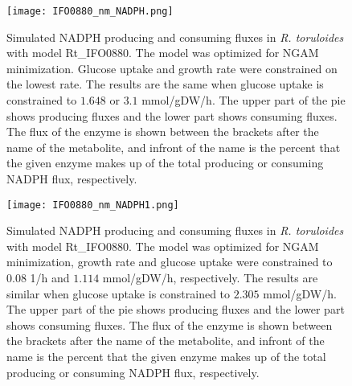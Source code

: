 \begin{figure}[H]
    \centering
    \texttt{[image: IFO0880\_nm\_NADPH.png]}
    \caption{Simulated NADPH producing and consuming fluxes in \textit{R. toruloides} with model Rt\_IFO0880. The model was optimized for NGAM minimization. 
    Glucose uptake and growth rate were constrained on the lowest rate. The results are the same when glucose uptake is constrained to $1.648$ or $3.1$ \unit{mmol/gDW/h}. The upper part of the pie shows producing fluxes and the lower part shows consuming fluxes.
    The flux of the enzyme is shown between the brackets after the name of the metabolite, and infront of the name is the percent
    that the given enzyme makes up of the total producing or consuming NADPH flux, respectively.}
    \label{fig:IFO0880_nm_NADPH}
\end{figure}
\begin{figure}[H]
    \centering
    \texttt{[image: IFO0880\_nm\_NADPH1.png]}
    \caption{Simulated NADPH producing and consuming fluxes in \textit{R. toruloides} with model Rt\_IFO0880. The model was optimized for NGAM minimization, 
    growth rate and glucose uptake were constrained to $0.08$ \unit{1/h} and $1.114$ \unit{mmol/gDW/h}, respectively. The results are similar when glucose uptake is constrained to $2.305$ \unit{mmol/gDW/h}. The upper part of the pie shows producing fluxes and the lower part shows consuming fluxes.
    The flux of the enzyme is shown between the brackets after the name of the metabolite, and infront of the name is the percent
    that the given enzyme makes up of the total producing or consuming NADPH flux, respectively.}
    \label{fig:IFO0880_nm_NADPH1}
\end{figure}


